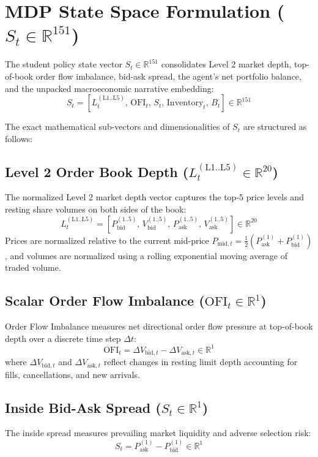 \section{MDP State Space Formulation ($S_t \in \mathbb{R}^{151}$)}

The student policy state vector $S_t \in \mathbb{R}^{151}$ consolidates Level 2 market depth, top-of-book order flow imbalance, bid-ask spread, the agent's net portfolio balance, and the unpacked macroeconomic narrative embedding:
\begin{equation}
    S_t = \left[ L_t^{(\text{L1..L5})}, \, \text{OFI}_t, \, S_t, \, \text{Inventory}_t, \, B_t \right] \in \mathbb{R}^{151}
\end{equation}

The exact mathematical sub-vectors and dimensionalities of $S_t$ are structured as follows:

\subsection{Level 2 Order Book Depth ($L_t^{(\text{L1..L5})} \in \mathbb{R}^{20}$)}
The normalized Level 2 market depth vector captures the top-5 price levels and resting share volumes on both sides of the book:
\begin{equation}
    L_t^{(\text{L1..L5})} = \left[ P_{\text{bid}}^{(1..5)}, \, V_{\text{bid}}^{(1..5)}, \, P_{\text{ask}}^{(1..5)}, \, V_{\text{ask}}^{(1..5)} \right] \in \mathbb{R}^{20}
\end{equation}
Prices are normalized relative to the current mid-price $P_{\text{mid}, t} = \frac{1}{2}(P_{\text{ask}}^{(1)} + P_{\text{bid}}^{(1)})$, and volumes are normalized using a rolling exponential moving average of traded volume.

\subsection{Scalar Order Flow Imbalance ($\text{OFI}_t \in \mathbb{R}^1$)}
Order Flow Imbalance measures net directional order flow pressure at top-of-book depth over a discrete time step $\Delta t$:
\begin{equation}
    \text{OFI}_t = \Delta V_{\text{bid}, t} - \Delta V_{\text{ask}, t} \in \mathbb{R}^1
\end{equation}
where $\Delta V_{\text{bid}, t}$ and $\Delta V_{\text{ask}, t}$ reflect changes in resting limit depth accounting for fills, cancellations, and new arrivals.

\subsection{Inside Bid-Ask Spread ($S_t \in \mathbb{R}^1$)}
The inside spread measures prevailing market liquidity and adverse selection risk:
\begin{equation}
    S_t = P_{\text{ask}}^{(1)} - P_{\text{bid}}^{(1)} \in \mathbb{R}^1
\end{equation}

